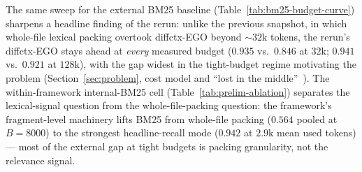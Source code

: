 \documentclass[11pt, a4paper]{article}
\begin{document}
The same sweep for the external BM25 baseline (Table~\ref{tab:bm25-budget-curve}) sharpens a headline finding of the rerun: unlike the previous snapshot, in which whole-file lexical packing overtook diffctx-EGO beyond ${\sim}32\mathrm{k}$ tokens, the rerun's diffctx-EGO stays ahead at \emph{every} measured budget ($0.935$ vs.\ $0.846$ at $32\mathrm{k}$; $0.941$ vs.\ $0.921$ at $128\mathrm{k}$), with the gap widest in the tight-budget regime motivating the problem (Section~\ref{sec:problem}, cost model and ``lost in the middle''~\cite{liu2023lost}). The within-framework internal-BM25 cell (Table~\ref{tab:prelim-ablation}) separates the lexical-signal question from the whole-file-packing question: the framework's fragment-level machinery lifts BM25 from whole-file packing ($0.564$ pooled at $B{=}8000$) to the strongest headline-recall mode ($0.942$ at $2.9\mathrm{k}$ mean used tokens) --- most of the external gap at tight budgets is packing granularity, not the relevance signal.

\begin{table}[h]
\centering
\small
\caption{Budget curve for the external BM25-over-patch-identifiers baseline, same protocol (intent-to-treat, $n{=}500$ per test set), consolidated rerun. BM25 does not support $B{=}{-1}$ (it packs whole files in rank order to the budget).}
\label{tab:bm25-budget-curve}
\end{table}
\end{document}
